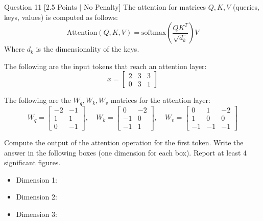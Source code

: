 \documentclass[11pt,a4paper]{article}
\begin{document}
\bigskip

\newpage
\begin{questionbox}{Question 11 \hfill [2.5 Points $\vert$ No Penalty]}
The attention for matrices $Q, K, V$ (queries, keys, values) is computed as follows:
\begin{equation*}
\text{Attention}(Q, K, V) = \text{softmax}\left(\frac{Q K^T}{\sqrt{d_k}}\right) V
\end{equation*}
Where $d_k$ is the dimensionality of the keys.

The following are the input tokens that reach an attention layer:
\begin{equation*}
x = \begin{bmatrix} 2 & 3 & 3 \\ 0 & 3 & 1 \end{bmatrix}
\end{equation*}

The following are the $W_q, W_k, W_v$ matrices for the attention layer:
\begin{equation*}
W_q = \begin{bmatrix} -2 & -1 \\ 1 & 1 \\ 0 & -1 \end{bmatrix}, \quad
W_k = \begin{bmatrix} 0 & -2 \\ -1 & 0 \\ -1 & 1 \end{bmatrix}, \quad
W_v = \begin{bmatrix} 0 & 1 & -2 \\ 1 & 0 & 0 \\ -1 & -1 & -1 \end{bmatrix}
\end{equation*}

Compute the output of the attention operation for the first token. Write the answer in the following boxes (one dimension for each box). Report at least 4 significant figures.

\medskip
\begin{itemize}
    \item Dimension 1: \framebox[3cm]{\phantom{3}}
    \item Dimension 2: \framebox[3cm]{\phantom{-3}}
    \item Dimension 3: \framebox[3cm]{\phantom{-5}}
\end{itemize}
\end{questionbox}
\end{document}
